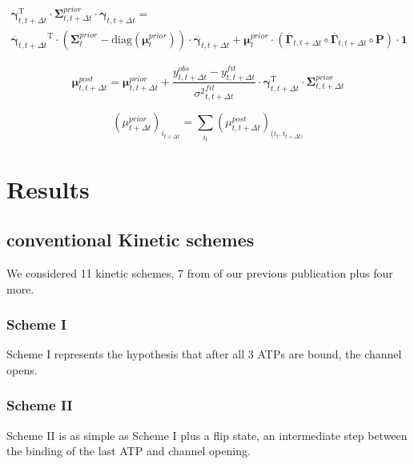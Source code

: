 \documentclass[pdflatex,sn-mathphys-num]{sn-jnl}%
\theoremstyle{thmstyleone}%
\theoremstyle{thmstyletwo}%
\theoremstyle{thmstylethree}%
\begin{document}
\begin{multline}
 {\mathbf \gamma}^{\mathrm{T}}_{t, t+\Delta t} \cdot \mathbf \Sigma^{prior}_{t, t+\Delta t} \cdot \mathbf \gamma_{t, t+\Delta t}= \\
{\overline {\mathbf \gamma}_{t, t+\Delta t}}^\mathrm{T} \cdot 
(\mathbf \Sigma^{prior}_{t} -\mathrm{diag}( \mathbf \mu^{prior}_t))\cdot  
{\overline {\mathbf \gamma}_{t, t+\Delta t}}+ 
\mathbf \mu^{prior}_t \cdot ( \overline {\mathbf \Gamma}_{t, t + \Delta t}  \circ  \overline {\mathbf \Gamma}_{t, t + \Delta t}  \circ \mathbf P ) \cdot \mathbf 1
\end{multline}

\begin{equation}
\mathbf \mu^{post}_{t, t+ \Delta t}= \mathbf \mu^{prior}_{t, t+ \Delta t} + 
{\frac {y^{obs}_{t, t+ \Delta t} - y^{fit}_{t, t+ \Delta t}}{{\sigma^2}^{fit}_{t, t+ \Delta t}} }
\cdot {\mathbf \gamma}^\mathrm{T}_{t, t+ \Delta t} \cdot \mathbf \Sigma^{prior}_{t, t+ \Delta t} 
\end{equation}

\begin{equation}
	( \mu^{prior}_{t+ \Delta t})_{i_{t+\Delta t}} = \sum_{i_t} (\mu^{post}_{t, t+\Delta t})_{(i_t, i_{t+\Delta t)}}
\end{equation}
\begin{equation}
\end{equation}














\section{Results}\label{sec2}
\subsection{conventional Kinetic schemes}\label{subsec2}

We considered 11 kinetic schemes, 7 from of our previous publication plus four more. 
\subsubsection{Scheme I} \label{schemeI}
Scheme I represents the hypothesis that  after all 3 ATPs are bound, the channel opens. 

\subsubsection{Scheme II} \label{scheme I}
Scheme II is as simple as Scheme I plus a flip state, an intermediate step between the binding of the last ATP and channel opening. 
\end{document}
